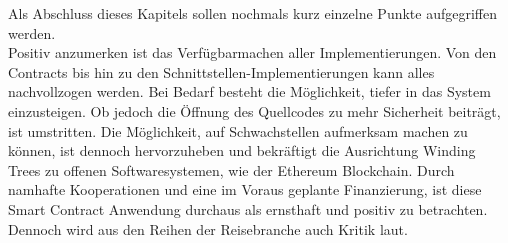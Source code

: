 Als Abschluss dieses Kapitels sollen nochmals kurz einzelne Punkte aufgegriffen werden.\\
Positiv anzumerken ist das Verfügbarmachen aller Implementierungen. Von den Contracts bis hin zu den Schnittstellen-Implementierungen kann alles nachvollzogen werden. Bei Bedarf besteht die Möglichkeit, tiefer in das System einzusteigen. Ob jedoch die Öffnung des Quellcodes zu mehr Sicherheit beiträgt, ist umstritten. Die Möglichkeit, auf Schwachstellen aufmerksam machen zu können, ist dennoch hervorzuheben und bekräftigt die Ausrichtung Winding Trees zu offenen Softwaresystemen, wie der Ethereum Blockchain. Durch namhafte Kooperationen und eine im Voraus geplante Finanzierung, ist diese Smart Contract Anwendung durchaus als ernsthaft und positiv zu betrachten.\\ 
Dennoch wird aus den Reihen der Reisebranche auch Kritik laut.

